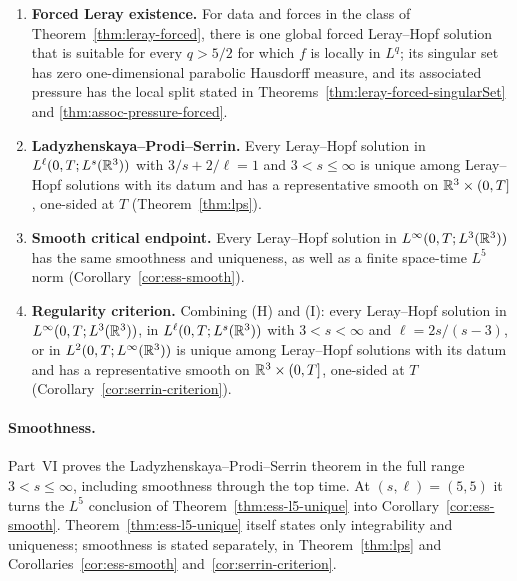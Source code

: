 \documentclass[11pt,letterpaper]{article}
\numberwithin{equation}{section}
\theoremstyle{plain}
\theoremstyle{definition}
\theoremstyle{remark}
\begin{document}
\begin{enumerate}[label=\textbf{(\Alph*)},leftmargin=2.8em]
\item \textbf{Forced Leray existence.} For data and forces in the class of
Theorem~\ref{thm:leray-forced}, there is one global forced Leray--Hopf
solution that is suitable for every $q>5/2$ for which $f$ is locally in
$L^q$; its singular set has zero one-dimensional parabolic Hausdorff
measure, and its associated pressure has the local split stated in
Theorems~\ref{thm:leray-forced-singularSet} and
\ref{thm:assoc-pressure-forced}.
\item \textbf{Ladyzhenskaya--Prodi--Serrin.} Every Leray--Hopf solution in $L^\ell(0,T;L^s(\mathbb{R}^3))$ with $3/s+2/\ell=1$ and $3<s\le\infty$ is unique among Leray--Hopf solutions with its datum and has a representative smooth on $\mathbb{R}^3\times(0,T]$, one-sided at $T$ (Theorem~\ref{thm:lps}).

\item \textbf{Smooth critical endpoint.} Every Leray--Hopf solution in $L^\infty(0,T;L^3(\mathbb{R}^3))$ has the same smoothness and uniqueness, as well as a finite space-time $L^5$ norm (Corollary~\ref{cor:ess-smooth}).

\item \textbf{Regularity criterion.} Combining (H) and (I): every Leray--Hopf solution in $L^\infty(0,T;L^3(\mathbb{R}^3))$, in $L^\ell(0,T;L^s(\mathbb{R}^3))$ with $3<s<\infty$ and $\ell=2s/(s-3)$, or in $L^2(0,T;L^\infty(\mathbb{R}^3))$ is unique among Leray--Hopf solutions with its datum and has a representative smooth on $\mathbb{R}^3\times(0,T]$, one-sided at $T$ (Corollary~\ref{cor:serrin-criterion}).
\end{enumerate}

\paragraph{Smoothness.}
Part~VI proves the Ladyzhenskaya--Prodi--Serrin theorem in the full range $3<s\le\infty$, including smoothness through the top time. At $(s,\ell)=(5,5)$ it turns the $L^5$ conclusion of Theorem~\ref{thm:ess-l5-unique} into Corollary~\ref{cor:ess-smooth}. Theorem~\ref{thm:ess-l5-unique} itself states only integrability and uniqueness; smoothness is stated separately, in Theorem~\ref{thm:lps} and Corollaries~\ref{cor:ess-smooth} and~\ref{cor:serrin-criterion}.
\end{document}
